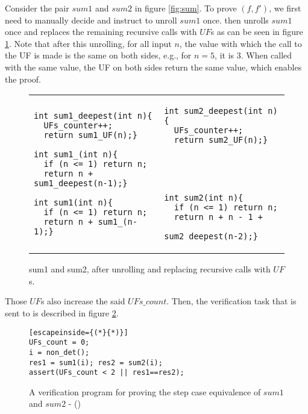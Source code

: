 \begin{example}
Consider the pair $sum1$ and $sum2$ in figure \ref{fig:sum}. To prove $(f,f')$, we first need to manually decide and instruct  to unroll $sum1$ once.  then unrolls $sum1$ once and replaces the remaining recursive calls with $UF$s as can be seen in figure \ref{fig:sumUnrolled}. Note that after this unrolling, for all input $n$, the value with which the call to the UF is made is the same on both sides, e.g., for $n=5$, it is $3$. When called with the same value, the UF on both sides return the same value, which enables the proof. 
	\begin{figure}
		\begin{center}
			\begin{tabular}{ll}
			\begin{minipage}{6.5 cm}
\begin{lstlisting}
int sum1_deepest(int n){
  UFs_counter++;
  return sum1_UF(n);}

int sum1_(int n){
  if (n <= 1) return n;
  return n + sum1_deepest(n-1);}
					
int sum1(int n){
  if (n <= 1) return n;
  return n + sum1_(n-1);}
\end{lstlisting}
			\end{minipage} &		
			\begin{minipage}{6 cm}
				\begin{lstlisting}
int sum2_deepest(int n){
  UFs_counter++;
  return sum2_UF(n);}
			
						
			
			
					
int sum2(int n){
  if (n <= 1) return n;
  return n + n - 1 + 
           sum2_deepest(n-2);}
\end{lstlisting}
\end{minipage}
\end{tabular}
\caption{sum1 and sum2, after unrolling and replacing recursive calls with $UF$s.}
\label{fig:sumUnrolled}
\end{center}
\end{figure} 
%
Those $UF$s also increase the said $UFs\_count$. Then, the verification task that is sent to  is described in figure \ref{fig:rvtstepcase}.
	
\begin{figure}
	\begin{center}
	\begin{minipage}{7 cm}
\begin{lstlisting}[escapeinside={(*}{*)}]
UFs_count = 0;
i = non_det();
res1 = sum1(i); res2 = sum2(i);
assert(UFs_count < 2 || res1==res2);
\end{lstlisting}
\end{minipage}
\caption{A verification program for proving the step case equivalence of $sum1$ and $sum2$ - ()}
			\label{fig:rvtstepcase}
		\end{center}
	\end{figure}
\end{example}


